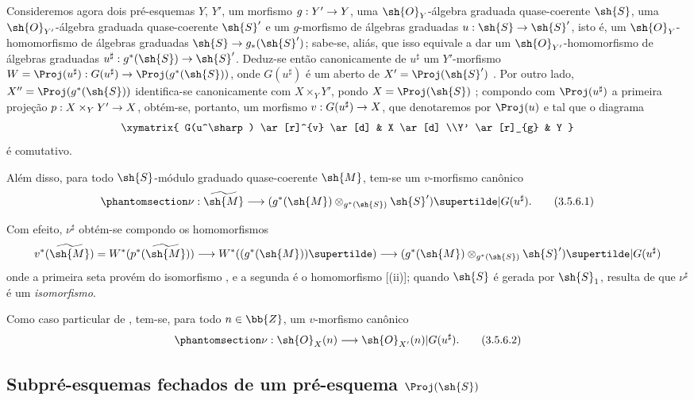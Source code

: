 \documentclass[oneside,10pt]{amsart}
\makeatletter
\newcommand{\ega@arrow}[2]{\mathchoice{#1}{#2}{#2}{#2}}
\renewcommand{\to}{\ega@arrow{\longrightarrow}{\rightarrow}}
\newcommand{\oldpage}[2][]{\marginnote{\normalfont\footnotesize\textbf{#1}~|~#2}\ignorespaces}
\let\EGAOriginalLabel\label
\renewcommand{\label}[1]{\phantomsection\EGAOriginalLabel{#1}}
\makeatother
\begin{document}
\begin{env}[3.5.6]
\label{II.3.5.6}
Consideremos agora dois pré-esquemas $Y$, $Y'$, um morfismo $g:Y'\to Y$, uma $\sh{O}_Y$-álgebra graduada quase-coerente $\sh{S}$, uma $\sh{O}_{Y'}$-álgebra graduada quase-coerente $\sh{S}'$ e um $g$-morfismo de álgebras graduadas $u:\sh{S}\to\sh{S}'$, isto é, um $\sh{O}_Y$-homomorfismo de álgebras graduadas $\sh{S}\to g_*(\sh{S}')$;
sabe-se, aliás, que isso equivale a dar um $\sh{O}_{Y'}$-homomorfismo de álgebras graduadas $u^\sharp:g^*(\sh{S})\to\sh{S}'$.
Deduz-se então canonicamente de $u^\sharp$ um $Y'$-morfismo $W=\Proj(u^\sharp):G(u^\sharp)\to\Proj(g^*(\sh{S}))$, onde $G(u^\sharp)$ é um aberto de $X'=\Proj(\sh{S}')$ .
Por outro lado, $X''=\Proj(g^*(\sh{S}))$ identifica-se
\oldpage[II]{64}
canonicamente com $X\times_Y Y'$, pondo $X=\Proj(\sh{S})$ ;
compondo com $\Proj(u^\sharp)$ a primeira projeção $p:X\times_Y Y'\to X$, obtém-se, portanto, um morfismo $v:G(u^\sharp)\to X$, que denotaremos por $\Proj(u)$ e tal que o diagrama
\[
  \xymatrix{
    G(u^\sharp) \ar[r]^{v} \ar[d]
    & X \ar[d]
  \\Y' \ar[r]_{g}
    & Y
  }
\]
é comutativo.

Além disso, para todo $\sh{S}$-módulo graduado quase-coerente $\sh{M}$, tem-se um $v$-morfismo canônico
\[
\label{II.3.5.6.1}
  \nu:\widetilde{\sh{M}}\to(g^*(\sh{M})\otimes_{g^*(\sh{S})}\sh{S}')\supertilde|G(u^\sharp).
\tag{3.5.6.1}
\]

Com efeito, $\nu^\sharp$ obtém-se compondo os homomorfismos
\[
  v^*(\widetilde{\sh{M}})
  =W^*(p^*(\widetilde{\sh{M}}))
  \to W^*((g^*(\sh{M}))\supertilde)
  \to (g^*(\sh{M})\otimes_{g^*(\sh{S})}\sh{S}')\supertilde|G(u^\sharp)
\]
onde a primeira seta provém do isomorfismo , e a segunda é o homomorfismo [(ii)];
quando $\sh{S}$ é gerada por $\sh{S}_1$, resulta de  que $\nu^\sharp$ é um \emph{isomorfismo}.

Como caso particular de , tem-se, para todo $n\in\bb{Z}$, um $v$-morfismo canônico
\[
\label{II.3.5.6.2}
  \nu:\sh{O}_X(n)\to\sh{O}_{X'}(n)|G(u^\sharp).
\tag{3.5.6.2}
\]
\end{env}

\subsection{Subpré-esquemas fechados de um pré-esquema $\Proj(\sh{S})$}
\label{subsection:II.3.6}
\end{document}
